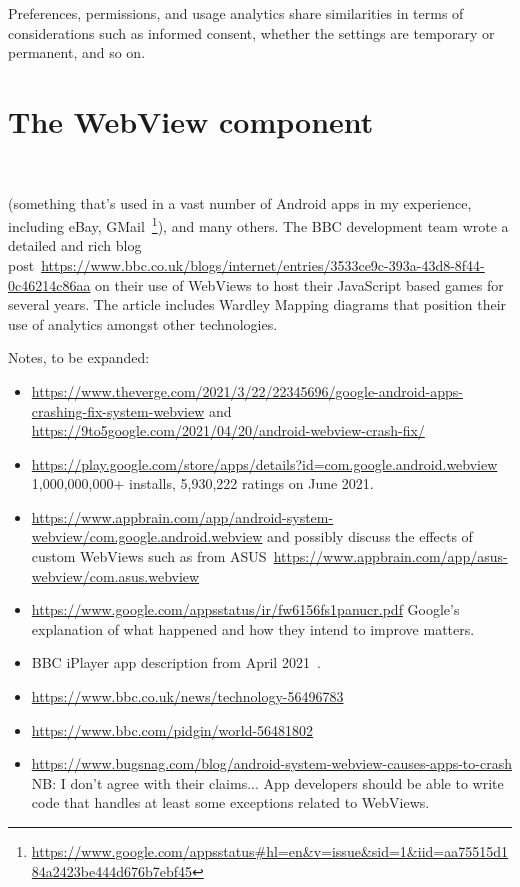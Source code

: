 Preferences, permissions, and usage analytics share similarities in terms of considerations such as informed consent, whether the settings are temporary or permanent, and so on.

\section{The WebView component}~\label{section-webview-component}

(something that's used in a vast number of Android apps in my experience, including eBay, GMail~\footnote{\url{https://www.google.com/appsstatus\#hl=en&v=issue&sid=1&iid=aa75515d184a2423be444d676b7ebf45}}), and many others. The BBC development team wrote a detailed and rich blog post~\url{https://www.bbc.co.uk/blogs/internet/entries/3533ce9c-393a-43d8-8f44-0c46214c86aa} on their use of WebViews to host their JavaScript based games for several years. The article includes Wardley Mapping diagrams that position their use of analytics amongst other technologies.

Notes, to be expanded:
\begin{itemize}
    \item \url{https://www.theverge.com/2021/3/22/22345696/google-android-apps-crashing-fix-system-webview} and \url{https://9to5google.com/2021/04/20/android-webview-crash-fix/}
    \item \url{https://play.google.com/store/apps/details?id=com.google.android.webview} 1,000,000,000+ installs, 5,930,222 ratings on  June 2021.
    \item \url{https://www.appbrain.com/app/android-system-webview/com.google.android.webview} and possibly discuss the effects of custom WebViews such as from ASUS~\url{https://www.appbrain.com/app/asus-webview/com.asus.webview}
    \item \url{https://www.google.com/appsstatus/ir/fw6156fs1panucr.pdf} Google's explanation of what happened and how they intend to improve matters.
    \item BBC iPlayer app description from  April 2021~\citep{bbc_iplayer_app_april_2021_webview_information}.
    \item \url{https://www.bbc.co.uk/news/technology-56496783}
    \item \url{https://www.bbc.com/pidgin/world-56481802}
    \item \url{https://www.bugsnag.com/blog/android-system-webview-causes-apps-to-crash} NB: I don't agree with their claims... App developers should be able to write code that handles at least some exceptions related to WebViews.
\end{itemize}



